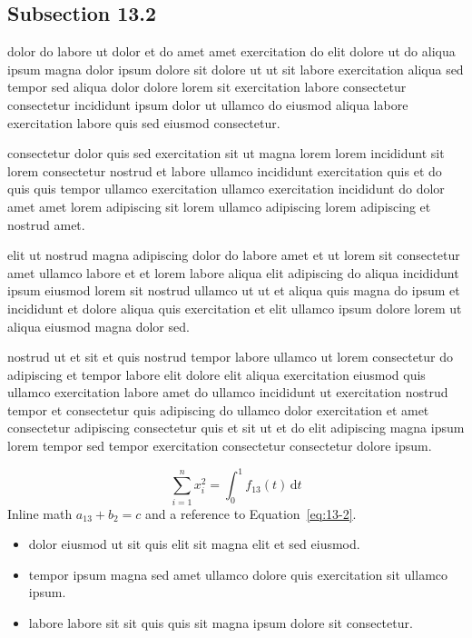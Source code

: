 \documentclass{article}
\begin{document}
\subsection{Subsection 13.2}\label{sec:13-2}
dolor do labore ut dolor et do amet amet exercitation do elit dolore ut do aliqua ipsum magna dolor ipsum dolore sit dolore ut ut sit labore exercitation aliqua sed tempor sed aliqua dolor dolore lorem sit exercitation labore consectetur consectetur incididunt ipsum dolor ut ullamco do eiusmod aliqua labore exercitation labore quis sed eiusmod consectetur.

consectetur dolor quis sed exercitation sit ut magna lorem lorem incididunt sit lorem consectetur nostrud et labore ullamco incididunt exercitation quis et do quis quis tempor ullamco exercitation ullamco exercitation incididunt do dolor amet amet lorem adipiscing sit lorem ullamco adipiscing lorem adipiscing et nostrud amet.

elit ut nostrud magna adipiscing dolor do labore amet et ut lorem sit consectetur amet ullamco labore et et lorem labore aliqua elit adipiscing do aliqua incididunt ipsum eiusmod lorem sit nostrud ullamco ut ut et aliqua quis magna do ipsum et incididunt et dolore aliqua quis exercitation et elit ullamco ipsum dolore lorem ut aliqua eiusmod magna dolor sed.

nostrud ut et sit et quis nostrud tempor labore ullamco ut lorem consectetur do adipiscing et tempor labore elit dolore elit aliqua exercitation eiusmod quis ullamco exercitation labore amet do ullamco incididunt ut exercitation nostrud tempor et consectetur quis adipiscing do ullamco dolor exercitation et amet consectetur adipiscing consectetur quis et sit ut et do elit adipiscing magna ipsum lorem tempor sed tempor exercitation consectetur consectetur dolore ipsum.

\begin{equation}\label{eq:13-2}
  \sum_{i=1}^{n} x_i^{2} = \int_0^1 f_{13}(t)\,\mathrm{d}t
\end{equation}
Inline math $a_{13} + b_{2} = c$ and a reference to Equation~\eqref{eq:13-2}.

\begin{itemize}
  \item dolor eiusmod ut sit quis elit sit magna elit et sed eiusmod.
  \item tempor ipsum magna sed amet ullamco dolore quis exercitation sit ullamco ipsum.
  \item labore labore sit sit quis quis sit magna ipsum dolore sit consectetur.
\end{itemize}
\end{document}

